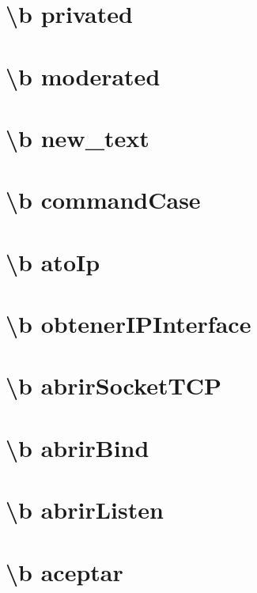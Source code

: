 \documentclass[twoside]{book}
\begin{document}
\chapter{\textbackslash{}b privated}
\label{privated}
\hypertarget{privated}{}

\chapter{\textbackslash{}b moderated}
\label{moderated}
\hypertarget{moderated}{}

\chapter{\textbackslash{}b new\-\_\-text}
\label{new_text}
\hypertarget{new_text}{}

\chapter{\textbackslash{}b command\-Case}
\label{commandCase}
\hypertarget{commandCase}{}

\chapter{\textbackslash{}b ato\-Ip}
\label{atoIp}
\hypertarget{atoIp}{}

\chapter{\textbackslash{}b obtener\-I\-P\-Interface}
\label{obtenerIPInterface}
\hypertarget{obtenerIPInterface}{}

\chapter{\textbackslash{}b abrir\-Socket\-T\-C\-P}
\label{abrirSocketTCP}
\hypertarget{abrirSocketTCP}{}

\chapter{\textbackslash{}b abrir\-Bind}
\label{abrirBind}
\hypertarget{abrirBind}{}

\chapter{\textbackslash{}b abrir\-Listen}
\label{abrirListen}
\hypertarget{abrirListen}{}

\chapter{\textbackslash{}b aceptar}
\label{aceptar}
\hypertarget{aceptar}{}

\end{document}
